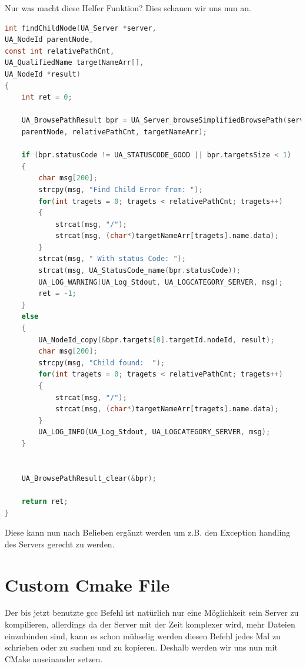 Nur was macht diese Helfer Funktion?
Dies schauen wir uns nun an.
\begin{lstlisting}[language=C]
int findChildNode(UA_Server *server, 
UA_NodeId parentNode, 
const int relativePathCnt, 
UA_QualifiedName targetNameArr[], 
UA_NodeId *result) 
{
	int ret = 0;
	
	UA_BrowsePathResult bpr = UA_Server_browseSimplifiedBrowsePath(server, 
	parentNode, relativePathCnt, targetNameArr);
	
	if (bpr.statusCode != UA_STATUSCODE_GOOD || bpr.targetsSize < 1)
	{
		char msg[200];
		strcpy(msg, "Find Child Error from: ");
		for(int tragets = 0; tragets < relativePathCnt; tragets++)
		{
			strcat(msg, "/");
			strcat(msg, (char*)targetNameArr[tragets].name.data);
		}
		strcat(msg, " With status Code: "); 
		strcat(msg, UA_StatusCode_name(bpr.statusCode));
		UA_LOG_WARNING(UA_Log_Stdout, UA_LOGCATEGORY_SERVER, msg);
		ret = -1;
	}
	else
	{
		UA_NodeId_copy(&bpr.targets[0].targetId.nodeId, result);
		char msg[200];
		strcpy(msg, "Child found:  ");
		for(int tragets = 0; tragets < relativePathCnt; tragets++)
		{
			strcat(msg, "/");
			strcat(msg, (char*)targetNameArr[tragets].name.data);
		}
		UA_LOG_INFO(UA_Log_Stdout, UA_LOGCATEGORY_SERVER, msg);
	}
	
	
	UA_BrowsePathResult_clear(&bpr);
	
	return ret;
}
\end{lstlisting}
Diese kann nun nach Belieben ergänzt werden um z.B. den Exception handling des Servers gerecht zu werden.
\clearpage
\section{Custom Cmake File}
Der bis jetzt benutzte gcc Befehl ist natürlich nur eine Möglichkeit sein Server zu kompilieren, allerdings da der Server mit der Zeit komplexer wird, mehr Dateien einzubinden sind, kann es schon mühselig werden diesen Befehl jedes Mal zu schrieben oder zu suchen und zu kopieren.
Deshalb werden wir uns nun mit CMake auseinander setzen.

